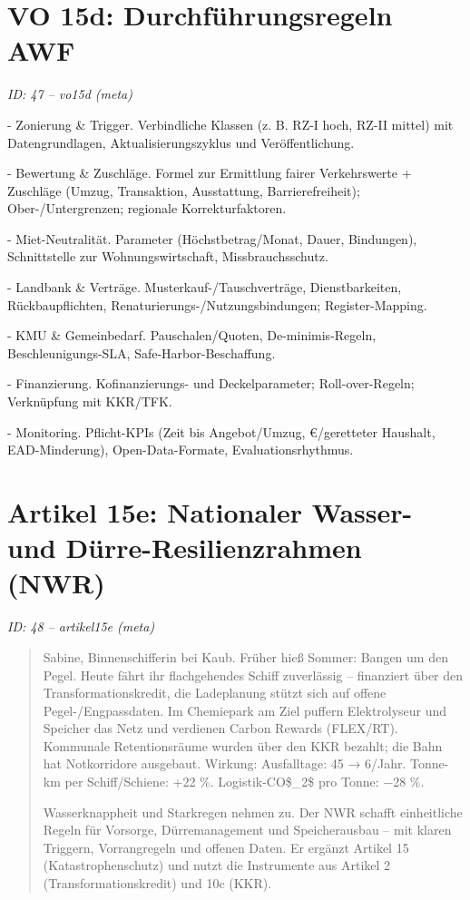 \documentclass[12pt,a4paper]{scrartcl}
\begin{document}
\section[VO 15d: Durchführungsregeln AWF]{VO 15d: Durchführungsregeln AWF}
\noindent\textit{ID: 47 -- vo15d (meta)}

- Zonierung \& Trigger. Verbindliche Klassen (z. B. RZ-I hoch, RZ-II mittel) mit Datengrundlagen, Aktualisierungszyklus und Veröffentlichung.

- Bewertung \& Zuschläge. Formel zur Ermittlung fairer Verkehrswerte + Zuschläge (Umzug, Transaktion, Ausstattung, Barrierefreiheit); Ober-/Untergrenzen; regionale Korrekturfaktoren.

- Miet-Neutralität. Parameter (Höchstbetrag/Monat, Dauer, Bindungen), Schnittstelle zur Wohnungswirtschaft, Missbrauchsschutz.

- Landbank \& Verträge. Musterkauf-/Tauschverträge, Dienstbarkeiten, Rückbaupflichten, Renaturierungs-/Nutzungsbindungen; Register-Mapping.

- KMU \& Gemeinbedarf. Pauschalen/Quoten, De-minimis-Regeln, Beschleunigungs-SLA, Safe-Harbor-Beschaffung.

- Finanzierung. Kofinanzierungs- und Deckelparameter; Roll-over-Regeln; Verknüpfung mit KKR/TFK.

- Monitoring. Pflicht-KPIs (Zeit bis Angebot/Umzug, €/geretteter Haushalt, EAD-Minderung), Open-Data-Formate, Evaluationsrhythmus.


\section[Artikel 15e: Nationaler Wasser- und Dürre-Resilienzrahmen (NWR)]{Artikel 15e: Nationaler Wasser- und Dürre-Resilienzrahmen (NWR)}
\noindent\textit{ID: 48 -- artikel15e (meta)}

\begin{quote}
Sabine, Binnenschifferin bei Kaub. Früher hieß Sommer: Bangen um den Pegel. Heute fährt ihr flachgehendes Schiff zuverlässig -- finanziert über den Transformationskredit, die Ladeplanung stützt sich auf offene Pegel-/Engpassdaten. Im Chemiepark am Ziel puffern Elektrolyseur und Speicher das Netz und verdienen Carbon Rewards (FLEX/RT). Kommunale Retentionsräume wurden über den KKR bezahlt; die Bahn hat Notkorridore ausgebaut. Wirkung: Ausfalltage: 45 → 6/Jahr. Tonne-km per Schiff/Schiene: +22 \%. Logistik-CO\$\_2\$ pro Tonne: −28 \%.

  Wasserknappheit und Starkregen nehmen zu. Der NWR schafft einheitliche Regeln für Vorsorge, Dürremanagement und Speicherausbau -- mit klaren Triggern, Vorrangregeln und offenen Daten. Er ergänzt Artikel 15 (Katastrophenschutz) und nutzt die Instrumente aus Artikel 2 (Transformationskredit) und 10c (KKR).
\end{quote}
\end{document}
